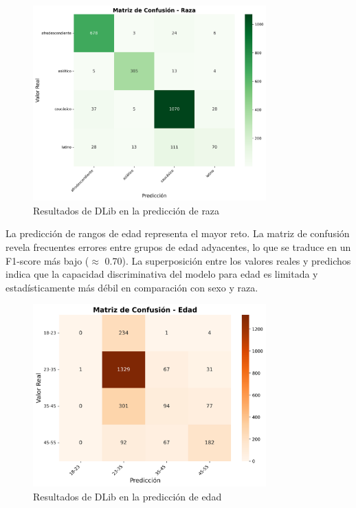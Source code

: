 \newpage
\begin{figure}[h]
  \centering
  \includegraphics[width=0.8\textwidth]{assets/MatrizConfusionRaza-dlib.png}
  \caption{Resultados de DLib en la predicción de raza}
  \label{fig:dlib_race_results}
\end{figure}

La predicción de rangos de edad representa el mayor reto. La matriz de confusión revela frecuentes errores entre grupos de edad adyacentes, lo que se traduce en un F1-score más bajo ($\approx$ 0.70). La superposición entre los valores reales y predichos indica que la capacidad discriminativa del modelo para edad es limitada y estadísticamente más débil en comparación con sexo y raza.

\newpage
\begin{figure}[h]
  \centering
  \includegraphics[width=0.8\textwidth]{assets/MatrizConfusionEdad-dlib.png}
  \caption{Resultados de DLib en la predicción de edad}
  \label{fig:dlib_age_results}
\end{figure}

